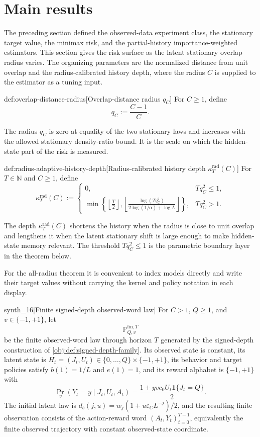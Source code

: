 \section{Main results}

The preceding section defined the observed-data experiment class, the stationary target value, the minimax risk, and the partial-history importance-weighted estimators. This section gives the risk surface as the latent stationary overlap radius varies. The organizing parameters are the normalized distance from unit overlap and the radius-calibrated history depth, where the radius \(C\) is supplied to the estimator as a tuning input.

\begin{definitionv}{def:overlap-distance-radius}[Overlap-distance radius \(q_C\)]
For \(C\ge 1\), define
\[
q_C:=\frac{C-1}{C}.
\]
\end{definitionv}

The radius \(q_C\) is zero at equality of the two stationary laws and increases with the allowed stationary density-ratio bound. It is the scale on which the hidden-state part of the risk is measured.

\begin{definitionv}{def:radius-adaptive-history-depth}[Radius-calibrated history depth \(\kappa_T^{\mathrm{rad}}(C)\)]
For \(T\in\mathbb N\) and \(C\ge 1\), define
\[
\kappa_T^{\mathrm{rad}}(C):=
\begin{cases}
0, & Tq_C^2\le 1,\\[3pt]
\displaystyle
\min\!\left\{
\left\lfloor\frac T2\right\rfloor,
\left\lfloor\frac{\log(Tq_C^2)}{2\log(1/\alpha)+\log L}\right\rfloor
\right\},
& Tq_C^2>1.
\end{cases}
\]
\end{definitionv}

The depth \(\kappa_T^{\mathrm{rad}}(C)\) shortens the history when the radius is close to unit overlap and lengthens it when the latent stationary shift is large enough to make hidden-state memory relevant. The threshold \(Tq_C^2\le1\) is the parametric boundary layer in the theorem below.

For the all-radius theorem it is convenient to index models directly and write their target values without carrying the kernel and policy notation in each display.

\begin{definitionv}{synth_16}[Finite signed-depth observed-word law]
For \(C>1\), \(Q\ge1\), and \(v\in\{-1,+1\}\), let
\[
\mathbb P_{Q,v}^{\mathrm{fin},T}
\]
be the finite observed-word law through horizon \(T\) generated by the signed-depth construction of \cref{obj:def:signed-depth-family}. Its observed state is constant, its latent state is \(H_t=(J_t,U_t)\in\{0,\ldots,Q\}\times\{-1,+1\}\), its behavior and target policies satisfy \(b(1)=1/L\) and \(e(1)=1\), and its reward alphabet is \(\{-1,+1\}\) with
\[
\Pr_v(Y_t=y\mid J_t,U_t,A_t)
=
\frac{1+yvc_0U_t\mathbf 1\{J_t=Q\}}{2}.
\]
The initial latent law is \(d_b(j,u)=w_j(1+u\varepsilon_C L^{-j})/2\), and the resulting finite observation consists of the action-reward word \((A_t,Y_t)_{t=0}^{T-1}\), equivalently the finite observed trajectory with constant observed-state coordinate.
\end{definitionv}

